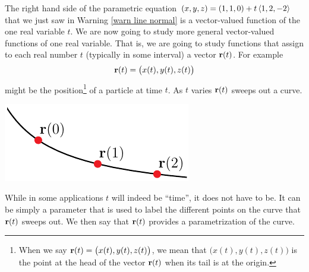 The right hand side of the parametric equation 
 $(x,y,z)=(1,1,0)+t\left< 1,2,-2\right>$ that we just saw in Warning 
\ref{warn line normal} is a vector-valued function of the one real 
variable $t$.
We are now going to study more general vector-valued functions of one 
real variable. That is, we are going to study functions that assign to 
each real number $t$ (typically in some interval) a vector $\mathbf{r}(t)$. 
For example
\begin{equation*}
\mathbf{r}(t) = \big( x(t), y(t), z(t)\big)
\end{equation*}
might be the position\footnote{When we say 
$\mathbf{r}(t) = \big( x(t), y(t), z(t)\big)$, we mean that 
$\big( x(t), y(t), z(t)\big)$ is the point at the head of the vector $\mathbf{r}(t)$ when its tail is at the origin.} of a particle at time $t$. As $t$ varies
$\mathbf{r}(t)$ sweeps out a curve.
\begin{efig}
\begin{center}
     \includegraphics{parCurve.pdf}
\end{center}
\end{efig}
While in some applications $t$ will indeed be ``time'', it does not
have to be. It can be simply a parameter that is used to label the
different points on the curve that $\mathbf{r}(t)$ sweeps out. We then say 
that $\mathbf{r}(t)$ provides a parametrization of the curve.

